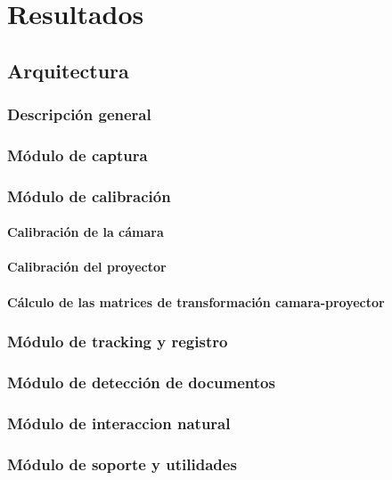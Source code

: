 \chapter{Resultados}
\label{chap:resultados}




\section{Arquitectura}
\subsection{Descripción general}
\subsection{Módulo de captura}
\subsection{Módulo de calibración}
\subsubsection{Calibración de la cámara}
\subsubsection{Calibración del proyector}
\subsubsection{Cálculo de las matrices de transformación camara-proyector}
\subsection{Módulo de tracking y registro}
\subsection{Módulo de detección de documentos}
\subsection{Módulo de interaccion natural}
\subsection{Módulo de soporte y utilidades}
